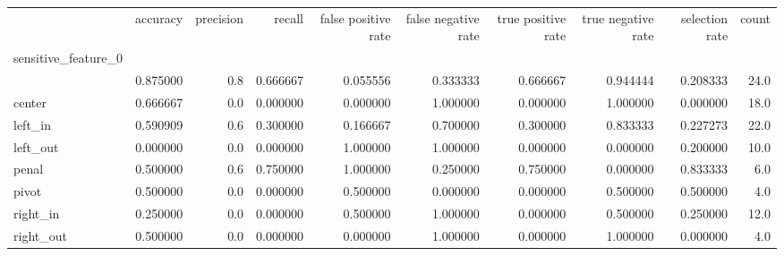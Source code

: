 \begin{tabular}{lrrrrrrrrr}
\toprule
{} &  accuracy &  precision &    recall &  false positive rate &  false negative rate &  true positive rate &  true negative rate &  selection rate &  count \\
sensitive\_feature\_0 &           &            &           &                      &                      &                     &                     &                 &        \\
\midrule
                    &  0.875000 &        0.8 &  0.666667 &             0.055556 &             0.333333 &            0.666667 &            0.944444 &        0.208333 &   24.0 \\
center              &  0.666667 &        0.0 &  0.000000 &             0.000000 &             1.000000 &            0.000000 &            1.000000 &        0.000000 &   18.0 \\
left\_in             &  0.590909 &        0.6 &  0.300000 &             0.166667 &             0.700000 &            0.300000 &            0.833333 &        0.227273 &   22.0 \\
left\_out            &  0.000000 &        0.0 &  0.000000 &             1.000000 &             1.000000 &            0.000000 &            0.000000 &        0.200000 &   10.0 \\
penal               &  0.500000 &        0.6 &  0.750000 &             1.000000 &             0.250000 &            0.750000 &            0.000000 &        0.833333 &    6.0 \\
pivot               &  0.500000 &        0.0 &  0.000000 &             0.500000 &             0.000000 &            0.000000 &            0.500000 &        0.500000 &    4.0 \\
right\_in            &  0.250000 &        0.0 &  0.000000 &             0.500000 &             1.000000 &            0.000000 &            0.500000 &        0.250000 &   12.0 \\
right\_out           &  0.500000 &        0.0 &  0.000000 &             0.000000 &             1.000000 &            0.000000 &            1.000000 &        0.000000 &    4.0 \\
\bottomrule
\end{tabular}
